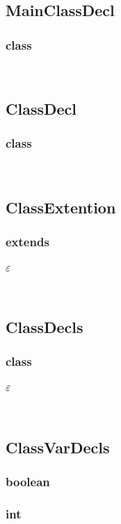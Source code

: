 \documentclass{report}
\begin{document}
\begin{multicols}{3}

\subsection*{MainClassDecl}
\subsubsection*{class}
\ 

\subsection*{ClassDecl}
\subsubsection*{class}
\ 

\subsection*{ClassExtention}
\subsubsection*{extends}
\subsubsection*{$\varepsilon$}
\ 

\subsection*{ClassDecls}
\subsubsection*{class}
\subsubsection*{$\varepsilon$}
\ 

\subsection*{ClassVarDecls}
\subsubsection*{boolean}
\subsubsection*{int}

\end{multicols}
\end{document}
